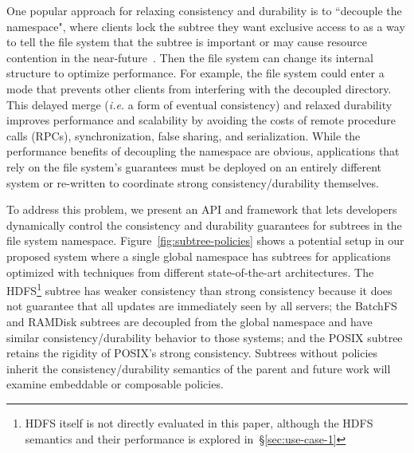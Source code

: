 One popular approach for relaxing consistency and durability is to ``decouple
the namespace", where clients lock the subtree they want exclusive access to as
a way to tell the file system that the subtree is important or may cause
resource contention in the near-future~\cite{grider:pdsw2015-marfs,
zheng:pdsw2015-deltafs, zheng:pdsw2014-batchfs, ren:sc2014-indexfs,
bent:slides-twotiers}. Then the file system can change its internal structure
to optimize performance. For example, the file system could enter a mode that
prevents other clients from interfering with the decoupled directory.  This
delayed merge ({\it i.e.} a form of eventual consistency) and relaxed
durability improves performance and scalability by avoiding the costs of remote
procedure calls (RPCs), synchronization, false sharing, and serialization.
While the performance benefits of decoupling the namespace are obvious,
applications that rely on the file system's guarantees must be deployed on an
entirely different system or re-written to coordinate strong
consistency/durability themselves.

%

To address this problem, we present an API and framework that lets developers
dynamically control the consistency and durability guarantees for subtrees in
the file system namespace.  Figure~\ref{fig:subtree-policies} shows a potential
setup in our proposed system where a single global namespace has subtrees for
applications optimized with techniques from different state-of-the-art
architectures.  The HDFS\footnote{HDFS itself is not directly evaluated in this
paper, although the HDFS semantics and their performance is explored
in~\S\ref{sec:use-case-1}} subtree has weaker consistency than strong
consistency because it does not guarantee that all updates are immediately seen
by all servers; the BatchFS and RAMDisk subtrees are decoupled from the global
namespace and have similar consistency/durability behavior to those systems;
and the POSIX subtree retains the rigidity of POSIX's strong consistency.
Subtrees without policies inherit the consistency/durability semantics of the
parent and future work will examine embeddable or composable policies.

